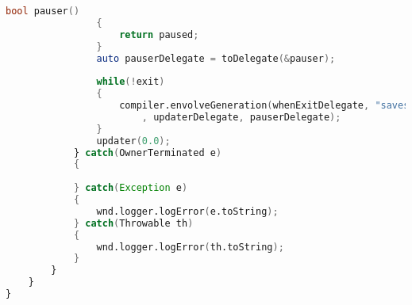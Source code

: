 \documentclass[russian,utf8,emptystyle]{eskdtext}
\begin{document}
\begin{lstlisting}[language=D]
                bool pauser()
                {
                    return paused;
                }
                auto pauserDelegate = toDelegate(&pauser);
                    
                while(!exit)
                {
                    compiler.envolveGeneration(whenExitDelegate, "saves"
                        , updaterDelegate, pauserDelegate);
                }
                updater(0.0);
            } catch(OwnerTerminated e)
            {
                
            } catch(Exception e)
            {
                wnd.logger.logError(e.toString);
            } catch(Throwable th)
            {
                wnd.logger.logError(th.toString);
            }
        }
    }
}
\end{lstlisting}
\end{document}
